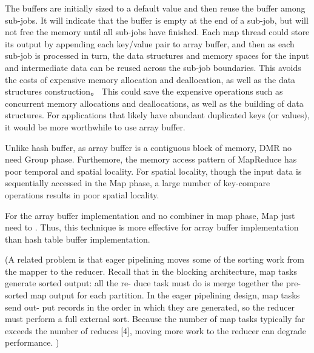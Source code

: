 
The buffers are initially sized to a default value 
and then reuse the buffer among sub-jobs.
It will indicate that the buffer is empty at the end of a sub-job, 
but will not free the memory until all sub-jobs have finished.
Each map thread could store its output by appending
each key/value pair to array buffer, 
and then as each sub-job is processed in turn,
the data structures and memory spaces 
for the input and intermediate data can be reused across the sub-job boundaries. 
This avoids the costs of expensive memory allocation and deallocation, 
as well as the data structures construction。
This could save the expensive operations such as
concurrent memory allocations and deallocations,
as well as the building of data structures.
For applications that likely have abundant duplicated keys (or values), 
it would be more worthwhile to use array buffer.

Unlike hash buffer, as array buffer is a contiguous block of memory, 
DMR no need Group phase.
Furthemore, the memory access pattern of MapReduce
has poor temporal and spatial locality.%
For spatial locality, 
though the input data is sequentially accessed in the Map phase,
a large number of key-compare operations results in poor spatial locality. 


For the array buffer implementation and no combiner in map phase,
Map just need to . Thus, this technique is more effective
for array buffer implementation than hash table buffer
implementation.

{\color{gray}(A related problem is that eager pipelining moves some of the
sorting work from the mapper to the reducer.
Recall that in the
blocking architecture, map tasks generate sorted output: all the re-
duce task must do is merge together the pre-sorted map output for
each partition. In the eager pipelining design, map tasks send out-
put records in the order in which they are generated, so the reducer
must perform a full external sort. Because the number of map tasks
typically far exceeds the number of reduces [4], moving more work
to the reducer can degrade performance.
)}




